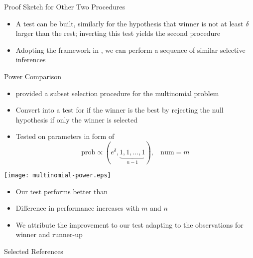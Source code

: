 \documentclass[final]{beamer}
\newlength{\onecolwid}
\begin{document}
\begin{frame}[t]
\begin{columns}[t]
\begin{column}{\onecolwid}

\begin{block}{Proof Sketch for Other Two Procedures}

\begin{itemize}
	\item A test can be built, similarly for the hypothesis that winner is not at least $\delta$ larger than the rest; inverting this test yields the second procedure
	\item Adopting the framework in \citet{Fithian:2015uj}, we can perform a sequence of similar selective inferences
\end{itemize}

\end{block}

\begin{block}{Power Comparison}

\begin{itemize}
\item \citet{Gupta:1967wg} provided a subset selection procedure for the multinomial problem
\item Convert into a test for if the winner is the best by rejecting the null hypothesis if only the winner is selected
\item Tested on parameters in form of
\[
\text{prob} \propto (e^\delta, \underbrace{1, 1, \ldots, 1}_{n - 1}), ~~~~ \text{num} = m
\]
\end{itemize}

\centering
\texttt{[image: multinomial-power.eps]}

\begin{itemize}
	\item Our test performs better than \citet{Gupta:1967wg}
	\item Difference in performance increases with $m$ and $n$
	\item We attribute the improvement to our test adapting to the observations for winner and runner-up
\end{itemize}

\end{block}

\begin{block}{Selected References}

\small{


\vspace{0.75in}
}

\end{block}

\end{column}

\end{columns}

\end{frame}
\end{document}
